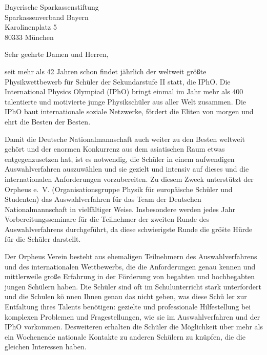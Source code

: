 \documentclass[../style/orpheus,fontsize=11pt]{scrlttr2}
\begin{document}

\begin{letter}{
\noindent Bayerische Sparkassenstiftung \\
Sparkassenverband Bayern\\
Karolinenplatz 5\\
80333 M\"unchen
}



\opening{Sehr geehrte Damen und Herren,}

seit mehr als 42 Jahren schon findet j\"ahrlich der weltweit gr\"o\ss te Physikwettbewerb f\"ur Sch\"uler der Sekundarstufe II statt, die IPhO.  Die International Physics Olympiad (IPhO) bringt einmal im Jahr mehr als 400 talentierte und motivierte junge Physiksch\"uler aus aller Welt zusammen.  Die IPhO baut internationale soziale Netzwerke, f\"ordert die Eliten von morgen und ehrt die Besten der Besten.

Damit die Deutsche Nationalmannschaft auch weiter zu den Besten weltweit geh\"ort und der enormen Konkurrenz aus dem asiatischen Raum etwas entgegenzusetzen hat, ist es notwendig, die Sch\"uler in einem aufwendigen Auswahlverfahren auszuw\"ahlen und sie gezielt und intensiv auf dieses und die internationalen Anforderungen vorzubereiten.  Zu diesem Zweck unterst\"utzt der Orpheus e.\, V. (Organisationsgruppe Physik f\"ur europ\"aische Sch\"uler und Studenten) das Auswahlverfahren f\"ur das Team der Deutschen Nationalmannschaft in vielf\"altiger Weise.  Insbesondere werden jedes Jahr Vorbereitungsseminare f\"ur die Teilnehmer der zweiten Runde des Auswahlverfahrens durchgef\"uhrt, da diese schwierigste Runde die gr\"o\"ste H\"urde f\"ur die Sch\"uler darstellt.

Der Orpheus Verein besteht aus ehemaligen Teilnehmern des Auswahlverfahrens und des internationalen Wettbewerbs, die die Anforderungen genau kennen und mittlerweile gro\ss e Erfahrung in der F\"orderung von begabten und hochbegabten jungen Sch\"ulern haben.  Die Sch\"uler sind oft im Schulunterricht stark unterfordert und die Schulen k\"o nnen Ihnen genau das nicht geben, was diese Sch\"u ler zur Entfaltung ihres Talents ben\"otigen: gezielte und professionale Hilfestellung bei komplexen Problemen und Fragestellungen, wie sie im Auswahlverfahren und der IPhO vorkommen.  Desweiteren erhalten die Sch\"uler die M\"oglichkeit \"uber mehr als ein Wochenende nationale Kontakte zu anderen Sch\"ulern zu kn\"upfen, die die gleichen Interessen haben.


\end{letter}
\end{document}
